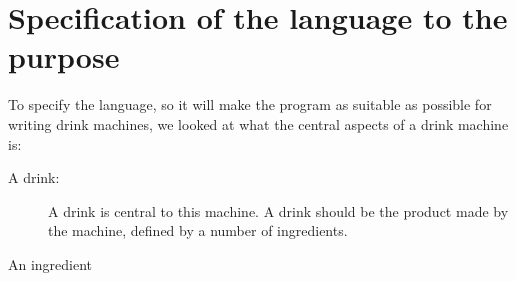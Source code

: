 \section{Specification of the language to the purpose}
To specify the language, so it will make the program as suitable as possible for writing drink machines, we looked at what the central aspects of a drink machine is:
\begin{description}
\item[A drink:] A drink is central to this machine. A drink should be the product made by the machine, defined by a number of ingredients.
\item[An ingredient] 
\end{description}
